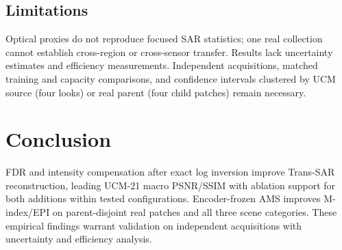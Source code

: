 \documentclass[journal]{IEEEtran}
\begin{document}
\subsection{Limitations}
Optical proxies do not reproduce focused SAR statistics; one real collection cannot establish cross-region or cross-sensor transfer. Results lack uncertainty estimates and efficiency measurements. Independent acquisitions, matched training and capacity comparisons, and confidence intervals clustered by UCM source (four looks) or real parent (four child patches) remain necessary.

\section{Conclusion}
FDR and intensity compensation after exact log inversion improve Trans-SAR reconstruction, leading UCM-21 macro PSNR/SSIM with ablation support for both additions within tested configurations. Encoder-frozen AMS improves M-index/EPI on parent-disjoint real patches and all three scene categories. These empirical findings warrant validation on independent acquisitions with uncertainty and efficiency analysis.
\end{document}

